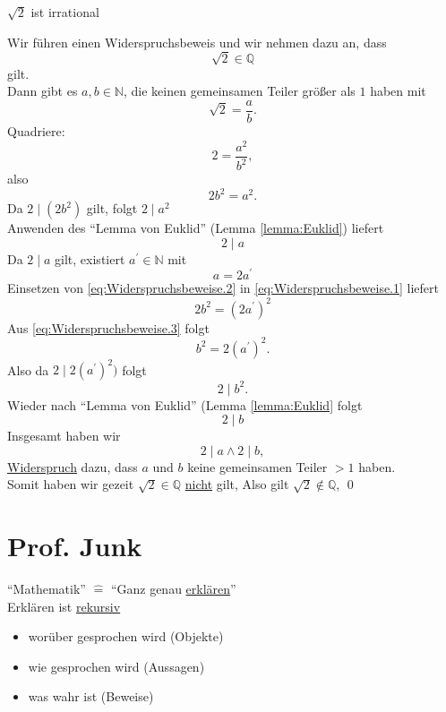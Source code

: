 \documentclass{myclass}
\begin{document}
\begin{subtheorem}
	\label{theorem:Sqrt2IstIrrational}
	$ \sqrt{2} $ ist irrational
\end{subtheorem}
\begin{subproof}
	Wir führen einen Widerspruchsbeweis und wir nehmen dazu an, dass
	\[ \sqrt{2} \in \mathbb{Q} \]
	gilt.\\
	Dann gibt es $ a, b \in \mathbb{N} $, die keinen gemeinsamen Teiler größer als $ 1 $ haben mit
	\[ \sqrt{2} = \frac{a}{b}. \]
	Quadriere:
	\[ 2 = \frac{a^2}{b^2}, \]
	also
	\begin{equation}
		\label{eq:Widerspruchsbeweise.1}
		2b^2 = a^2.
	\end{equation}
	Da $ 2 \mid ( 2b^2 ) $ gilt, folgt $ 2 \mid a^2 $\\
	Anwenden des ``Lemma von Euklid'' (Lemma \ref{lemma:Euklid}) liefert
	\[ 2 \mid a \]
	Da $ 2 \mid a $ gilt, existiert $ a^{\prime} \in \mathbb{N} $ mit
	\begin{equation}
		\label{eq:Widerspruchsbeweise.2}
		a = 2 a^{\prime}
	\end{equation}
	Einsetzen von \ref{eq:Widerspruchsbeweise.2} in \ref{eq:Widerspruchsbeweise.1} liefert
	\begin{equation}
		\label{eq:Widerspruchsbeweise.3}
		2b^2 = ( 2a^{\prime} )^2
	\end{equation}
	Aus \ref{eq:Widerspruchsbeweise.3} folgt
	\[ b^2 = 2 ( a^{\prime} )^2. \]
	Also da $ 2 \mid 2 ( a^{\prime} )^2 ) $ folgt
	\[ 2 \mid b^2. \]
	Wieder nach ``Lemma von Euklid'' (Lemma \ref{lemma:Euklid} folgt
	\[ 2 \mid b \]
	Insgesamt haben wir
	\[ 2\mid a \wedge 2 \mid b, \]
	\underline{Widerspruch} dazu, dass $ a $ und $ b $ keine gemeinsamen Teiler $ >1 $ haben.\\
	Somit haben wir gezeit $ \sqrt{2} \in \mathbb{Q} $ \underline{nicht} gilt, Also gilt $ \sqrt{2} \notin \mathbb{Q} $, \qed
\end{subproof}

\section{Prof. Junk}
``Mathematik'' $ \hat= $ ``Ganz genau \underline{erklären}''\\
Erklären ist \underline{rekursiv}
\begin{itemize}
	\item worüber gesprochen wird (Objekte)
	\item wie gesprochen wird (Aussagen)
	\item was wahr ist (Beweise)
\end{itemize}
\end{document}
